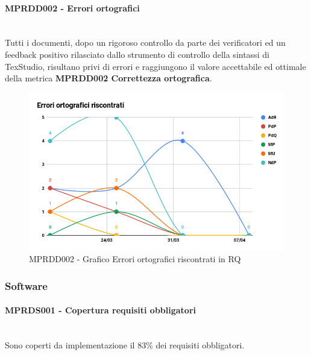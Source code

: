 \paragraph{MPRDD002 - Errori ortografici}\mbox{}\\[0.4cm]
Tutti i documenti, dopo un rigoroso controllo da parte dei verificatori ed un feedback positivo rilasciato dallo strumento di controllo della sintassi di TexStudio, risultano privi di errori e raggiungono il valore accettabile ed ottimale della metrica  \textbf{MPRDD002 Correttezza ortografica}.
\begin{figure}[H]
	\centering
	\includegraphics[width=13cm,keepaspectratio]{../includes/pics/Errori.png}
	\caption{\label{fig:mission}MPRDD002 - Grafico Errori ortografici riscontrati in RQ}
\end{figure}
\clearpage
\subsubsection{Software}
\paragraph{MPRDS001 - Copertura requisiti obbligatori}\mbox{}\\[0.4cm]
Sono coperti da implementazione il 83\% dei requisiti obbligatori.
